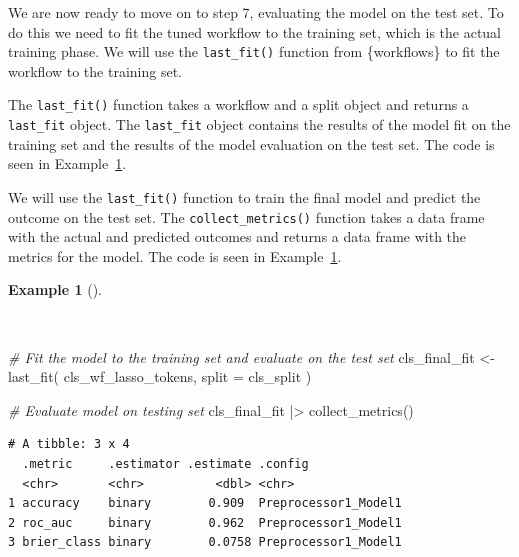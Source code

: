 \documentclass[
  letterpaper,
  krantz1]{latex/krantz-mod}
\newenvironment{Shaded}{\begin{snugshade}}{\end{snugshade}}
\newcommand{\AttributeTok}[1]{\textcolor[rgb]{0.00,0.00,0.00}{#1}}
\newcommand{\CommentTok}[1]{\textcolor[rgb]{0.00,0.00,0.00}{\textit{#1}}}
\newcommand{\FunctionTok}[1]{\textcolor[rgb]{0.00,0.00,0.00}{#1}}
\newcommand{\NormalTok}[1]{\textcolor[rgb]{0.00,0.00,0.00}{#1}}
\newcommand{\OtherTok}[1]{\textcolor[rgb]{0.00,0.00,0.00}{#1}}
\newcommand{\SpecialCharTok}[1]{\textcolor[rgb]{0.00,0.00,0.00}{#1}}
\theoremstyle{definition}
\newtheorem{example}{Example}[chapter]
\theoremstyle{definition}
\theoremstyle{remark}
\begin{document}
We are now ready to move on to step 7, evaluating the model on the test
set. To do this we need to fit the tuned workflow to the training set,
which is the actual training phase. We will use the \texttt{last\_fit()}
function from \{workflows\} to fit the workflow to the training set.

The \texttt{last\_fit()} function takes a workflow and a split object
and returns a \texttt{last\_fit} object. The \texttt{last\_fit} object
contains the results of the model fit on the training set and the
results of the model evaluation on the test set. The code is seen in
Example~\ref{exm-predict-class-tune-hyperparameters-evaluate-test}.

We will use the \texttt{last\_fit()} function to train the final model
and predict the outcome on the test set. The \texttt{collect\_metrics()}
function takes a data frame with the actual and predicted outcomes and
returns a data frame with the metrics for the model. The code is seen in
Example~\ref{exm-predict-class-tune-hyperparameters-evaluate-test}.

\pagebreak

\begin{example}[]\protect\hypertarget{exm-predict-class-tune-hyperparameters-evaluate-test}{}\label{exm-predict-class-tune-hyperparameters-evaluate-test}

~

\begin{Shaded}
\begin{Highlighting}[numbers=left,,]
\CommentTok{\# Fit the model to the training set and evaluate on the test set}
\NormalTok{cls\_final\_fit }\OtherTok{\textless{}{-}}
  \FunctionTok{last\_fit}\NormalTok{(}
\NormalTok{    cls\_wf\_lasso\_tokens,}
    \AttributeTok{split =}\NormalTok{ cls\_split}
\NormalTok{  )}

\CommentTok{\# Evaluate model on testing set}
\NormalTok{cls\_final\_fit }\SpecialCharTok{|\textgreater{}}
  \FunctionTok{collect\_metrics}\NormalTok{()}
\end{Highlighting}
\end{Shaded}

\begin{verbatim}
# A tibble: 3 x 4
  .metric     .estimator .estimate .config             
  <chr>       <chr>          <dbl> <chr>               
1 accuracy    binary        0.909  Preprocessor1_Model1
2 roc_auc     binary        0.962  Preprocessor1_Model1
3 brier_class binary        0.0758 Preprocessor1_Model1
\end{verbatim}

\end{example}
\end{document}
